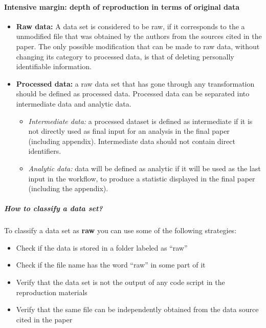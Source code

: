 \documentclass[]{book}
\providecommand{\tightlist}{%
  \setlength{\itemsep}{0pt}\setlength{\parskip}{0pt}}
\let\oldparagraph\paragraph
\renewcommand{\paragraph}[1]{\oldparagraph{#1}\mbox{}}
\let\oldsubparagraph\subparagraph
\renewcommand{\subparagraph}[1]{\oldsubparagraph{#1}\mbox{}}
\begin{document}
\hypertarget{intensive}{%
\paragraph{Intensive margin: depth of reproduction in terms of original data}\label{intensive}}

\begin{itemize}
\item
  \textbf{Raw data:} A data set is considered to be raw, if it corresponds to the a unmodified file that was obtained by the authors from the sources cited in the paper. The only possible modification that can be made to raw data, without changing its category to processed data, is that of deleting personally identifiable information.
\item
  \textbf{Processed data:} a raw data set that has gone through any transformation should be defined as processed data. Processed data can be separated into intermediate data and analytic data.

  \begin{itemize}
  \tightlist
  \item
    \emph{Intermediate data:} a processed dataset is defined as intermediate if it is not directly used as final input for an analysis in the final paper (including appendix). Intermediate data should not contain direct identifiers.
  \item
    \emph{Analytic data:} data will be defined as analytic if it will be used as the last input in the workflow, to produce a statistic displayed in the final paper (including the appendix).
  \end{itemize}
\end{itemize}

\hypertarget{how-to-classify-a-data-set}{%
\subparagraph{How to classify a data set?}\label{how-to-classify-a-data-set}}

To classify a data set as \textbf{raw} you can use some of the following strategies:

\begin{itemize}
\tightlist
\item
  Check if the data is stored in a folder labeled as ``raw''\\
\item
  Check if the file name has the word ``raw'' in some part of it\\
\item
  Verify that the data set is not the output of any code script in the reproduction materials\\
\item
  Verify that the same file can be independently obtained from the data source cited in the paper
\end{itemize}
\end{document}
